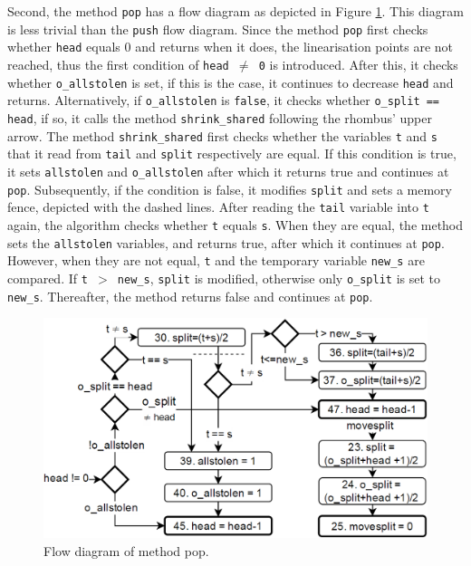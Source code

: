 \documentclass{sig-alternate-br}
\begin{document}
Second, the method \texttt{pop} has a flow diagram as depicted in Figure \ref{fig:pop}.
This diagram is less trivial than the \texttt{push} flow diagram.
Since the method \texttt{pop} first checks whether \texttt{head} equals 0 and returns when it does, the linearisation points are not reached, thus the first condition of \texttt{head $\neq$ 0} is introduced.
After this, it checks whether \texttt{o\_allstolen} is set, if this is the case, it continues to decrease \texttt{head} and returns.
Alternatively, if \texttt{o\_allstolen} is \texttt{false}, it checks whether \texttt{o\_split == head}, if so, it calls the method \texttt{shrink\_shared} following the rhombus' upper arrow.
The method \texttt{shrink\_shared} first checks whether the variables \texttt{t} and \texttt{s} that it read from \texttt{tail} and \texttt{split} respectively are equal.
If this condition is true, it sets \texttt{allstolen} and \texttt{o\_allstolen} after which it returns true and continues at \texttt{pop}.
Subsequently, if the condition is false, it modifies \texttt{split} and sets a memory fence, depicted with the dashed lines.
After reading the \texttt{tail} variable into \texttt{t} again, the algorithm checks whether \texttt{t} equals \texttt{s}.
When they are equal, the method sets the \texttt{allstolen} variables, and returns true, after which it continues at \texttt{pop}.
However, when they are not equal, \texttt{t} and the temporary variable \texttt{new\_s} are compared.
If \texttt{t $>$ new\_s}, \texttt{split} is modified, otherwise only \texttt{o\_split} is set to \texttt{new\_s}.
Thereafter, the method returns false and continues at \texttt{pop}.
\begin{figure}[h]
	\centering
	\includegraphics[scale=0.25]{Pop_flow_diagram_2.png}
	\caption{Flow diagram of method pop.}
	\label{fig:pop}
\end{figure}
\end{document}
